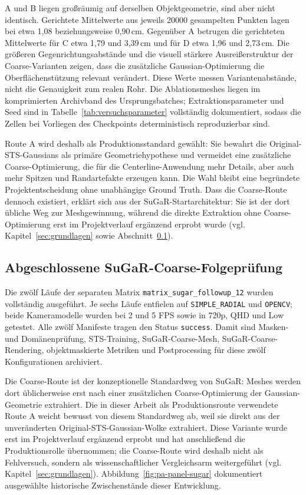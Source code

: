 A und B liegen großräumig auf derselben Objektgeometrie, sind aber nicht
identisch. Gerichtete Mittelwerte aus jeweils 20000 gesampelten Punkten lagen
bei etwa 1,08 beziehungsweise 0,90\,cm. Gegenüber A betrugen die gerichteten
Mittelwerte für C etwa 1,79 und 3,39\,cm und für D etwa 1,96 und 2,73\,cm. Die
größeren Gegenrichtungsabstände und die visuell stärkere Ausreißerstruktur der
Coarse-Varianten zeigen, dass die zusätzliche Gaussian-Optimierung die
Oberflächenstützung relevant verändert. Diese Werte messen Variantenabstände,
nicht die Genauigkeit zum realen Rohr. Die Ablationsmeshes liegen im
komprimierten Archivband des Ursprungsbatches; Extraktionsparameter und Seed
sind in Tabelle~\ref{tab:versuchsparameter} vollständig dokumentiert, sodass
die Zellen bei Vorliegen des Checkpoints deterministisch reproduzierbar sind.

Route A wird deshalb als Produktionsstandard gewählt: Sie bewahrt die
Original-STS-Gaussians als primäre Geometriehypothese und vermeidet eine
zusätzliche Coarse-Optimierung, die für die Centerline-Anwendung mehr Details,
aber auch mehr Spitzen und Randartefakte erzeugen kann. Die Wahl bleibt eine
begründete Projektentscheidung ohne unabhängige Ground Truth. Dass die
Coarse-Route dennoch existiert, erklärt sich aus der SuGaR-Startarchitektur:
Sie ist der dort übliche Weg zur Meshgewinnung, während die direkte Extraktion
ohne Coarse-Optimierung erst im Projektverlauf ergänzend erprobt wurde
(vgl. Kapitel~\ref{sec:grundlagen} sowie Abschnitt~\ref{sec:sugar-folgepruefung}).

\subsection{Abgeschlossene SuGaR-Coarse-Folgeprüfung}
\label{sec:sugar-folgepruefung}

Die zwölf Läufe der separaten Matrix
\texttt{matrix\_sugar\_followup\_12} wurden vollständig ausgeführt. Je sechs
Läufe entfielen auf \texttt{SIMPLE\_RADIAL} und \texttt{OPENCV}; beide
Kameramodelle wurden bei 2 und 5 FPS sowie in 720p, QHD und Low getestet. Alle
zwölf Manifeste tragen den Status \texttt{success}. Damit sind Masken- und
Domänenprüfung, STS-Training, SuGaR-Coarse-Mesh, SuGaR-Coarse-Rendering,
objektmaskierte Metriken und Postprocessing für diese zwölf Konfigurationen
archiviert.

Die Coarse-Route ist der konzeptionelle Standardweg von SuGaR: Meshes werden
dort üblicherweise erst nach einer zusätzlichen Coarse-Optimierung der
Gaussian-Geometrie extrahiert. Die in dieser Arbeit als Produktionsroute
verwendete Route A weicht bewusst von diesem Standardweg ab, weil sie direkt
aus der unveränderten Original-STS-Gaussian-Wolke extrahiert. Diese Variante
wurde erst im Projektverlauf ergänzend erprobt und hat anschließend die
Produktionsrolle übernommen; die Coarse-Route wird deshalb nicht als
Fehlversuch, sondern als wissenschaftlicher Vergleichsarm weitergeführt
(vgl. Kapitel~\ref{sec:grundlagen}). Abbildung~\ref{fig:pa-panel-sugar}
dokumentiert ausgewählte historische Zwischenstände dieser Entwicklung.


